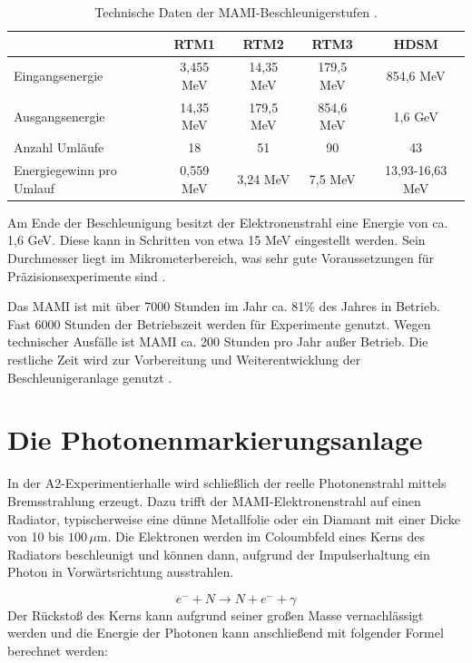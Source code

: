\documentclass[a4paper,11pt,oneside,final,german,openbib,pdftex]{scrbook}
\begin{document}
{\begin{table}[h!]
		\begin{tabular}{p{3cm}cccc}
		
			& RTM1 & RTM2 & RTM3 & HDSM \\

			\hline
			Eingangsenergie &3,455 MeV  &  14,35 MeV& 179,5 MeV  &854,6 MeV \\
			Ausgangsenergie &14,35 MeV  &  179,5 MeV &854,6 MeV  & 1,6 GeV \\ 
			Anzahl Uml\"aufe&18  &51  &90  &43 \\ 
			Energiegewinn  
			pro Umlauf &0,559 MeV  & 3,24 MeV & 7,5 MeV  & 13,93-16,63 MeV \\ 
			
	
		\end{tabular}

		\caption[Technische Daten der Mamibeschleunigerstufen]{Technische Daten der MAMI-Beschleunigerstufen \cite{Un08}.}
		\label{tab.MAMIstufen}

\end{table}

 Am Ende der Beschleunigung besitzt der Elektronenstrahl eine Energie von ca. 1,6 GeV. Diese kann in Schritten von etwa 15 MeV eingestellt werden. Sein Durchmesser liegt im Mikrometerbereich, was sehr gute Voraussetzungen f\"ur Pr\"azisionsexperimente sind \cite{KPh07}. 
 
 Das MAMI ist mit \"uber 7000 Stunden im Jahr ca. 81\% des Jahres in Betrieb. Fast 6000 Stunden der Betriebszeit werden f\"ur Experimente genutzt. Wegen technischer Ausf\"alle ist MAMI ca. 200 Stunden pro Jahr au{\ss}er Betrieb. Die restliche Zeit wird zur Vorbereitung und Weiterentwicklung der Beschleunigeranlage genutzt \cite{KPh11B}.
 
 
 \section{Die Photonenmarkierungsanlage}
 
 In der A2-Experimentierhalle wird schlie{\ss}lich der reelle Photonenstrahl mittels Bremsstrahlung erzeugt. Dazu trifft der MAMI-Elektronenstrahl auf einen Radiator, typischerweise eine d\"unne Metallfolie oder ein Diamant mit einer Dicke von 10 bis $100\, \mu\text{m}$. Die Elektronen werden im Coloumbfeld eines Kerns des Radiators beschleunigt und k\"onnen dann, aufgrund der Impulserhaltung ein Photon in Vorw\"artsrichtung ausstrahlen.
 
 \begin{equation}
 e^{-}+N\rightarrow N + e^{-}+\gamma
 \label{eq.Streuung}
 \end{equation}
  Der R\"ucksto{\ss} des Kerns kann aufgrund seiner gro{\ss}en Masse vernachl\"assigt werden und die Energie der Photonen kann anschlie{\ss}end mit folgender Formel berechnet werden:
  
}
\end{document}
